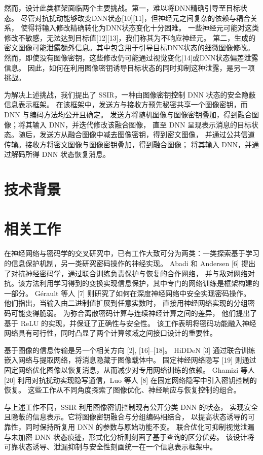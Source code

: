 \documentclass[UTF8,a4paper,zihao=-4,fontset=windows,openany]{ctexbook}
\begin{document}
然而，设计此类框架面临两个主要挑战。第一，难以将DNN精确引导至目标状态。
尽管对抗扰动能够改变DNN状态[10][11]，但神经元之间复杂的依赖与耦合关系，
使得将输入修改精确转化为DNN状态变化十分困难。
一些神经元可能对这类修改不敏感，无法达到目标值[12][13]，我们称其为不响应神经元。
第二，生成的密文图像可能泄露额外信息。其中包含用于引导目标DNN状态的细微图像修改。
然而，即使没有图像密钥，这些修改仍可能通过视觉变化[14]或DNN状态偏差泄露信息。
因此，如何在利用图像密钥诱导目标状态的同时抑制这种泄露，是另一项挑战。

为解决上述挑战，我们提出了 SSIR，一种由图像密钥控制 DNN 状态的安全隐蔽信息表示框架。
在该框架中，发送方与接收方预先秘密共享一个图像密钥，而 DNN 与编码方法均公开且确定。
发送方将随机图像与图像密钥叠加，得到融合图像；将其输入 DNN，并迭代修改该融合图像，
直至 DNN 呈现表示消息的目标状态。随后，发送方从融合图像中减去图像密钥，得到密文图像，
并通过公共信道传输。接收方将密文图像与图像密钥叠加，得到融合图像；
将其输入 DNN，并通过解码所得 DNN 状态恢复消息。

\section{技术背景}


\section{相关工作}
在神经网络与密码学的交叉研究中，已有工作大致可分为两类：一类探索基于学习的信息保护机制，另一类研究密码操作的神经实现。
Abadi 和 Andersen [6] 提出了对抗神经密码学，通过联合训练负责保护与恢复的合作网络，
并与敌对网络对抗。该方法利用学习得到的变换实现信息保护，其中专门的网络训练是框架构建的一部分。
Gérault 等人 [7] 则研究了如何在深度神经网络中安全实现密码操作。
他们指出，当输入由二进制值扩展到任意实数时，
直接用神经网络实现的分组密码可能变得脆弱。
为弥合离散密码计算与连续神经计算之间的差异，
他们提出了基于 ReLU 的实现，并保证了正确性与安全性。
该工作表明将密码功能融入神经网络具有可行性，同时凸显了两个计算领域之间接口设计的重要性。

基于图像的信息传输是另一个相关方向 [2], [16]–[18]。
HiDDeN [3] 通过联合训练嵌入网络与提取网络，将消息隐藏于图像载体中。
固定神经网络隐写 [19] 则通过固定网络优化图像以恢复消息，从而减少对专用网络训练的依赖。
Ghamizi 等人 [20] 利用对抗扰动实现隐写通信，Luo 等人 [8] 在固定网络隐写中引入密钥控制的恢复。
这些工作从不同角度探索了图像优化、神经响应与恢复控制的组合。

与上述工作不同，SSIR 利用图像密钥控制现有公开分类 DNN 的状态，
实现安全且隐蔽的信息表示。它将图像密钥融合与分组编码相结合，
以提高状态诱导的可靠性，同时保持所复用 DNN 的参数与原始功能不变。
联合优化可抑制视觉泄漏与未加密 DNN 状态痕迹，形式化分析则刻画了基于查询的区分优势。
该设计将可靠状态诱导、泄漏抑制与安全性刻画统一在一个信息表示框架中。
\end{document}
